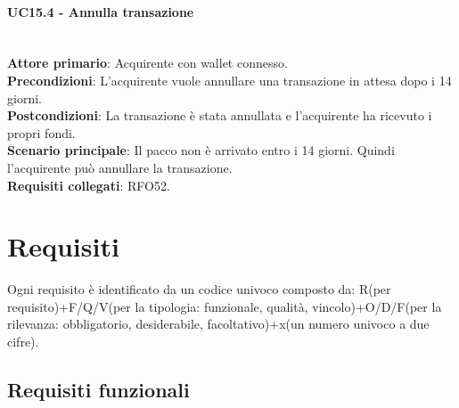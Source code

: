 \documentclass[a4paper, 12pt]{article}
\begin{document}
\paragraph{UC15.4 - Annulla transazione}\\
\textbf{Attore primario}: Acquirente  con wallet connesso.\\
\textbf{Precondizioni}: L'acquirente vuole annullare una transazione in attesa dopo i 14 giorni.\\
\textbf{Postcondizioni}: La transazione è stata annullata e l'acquirente ha ricevuto i propri fondi.\\
\textbf{Scenario principale}: Il pacco non è arrivato entro i 14 giorni. Quindi l'acquirente può annullare la transazione.\\
\textbf{Requisiti collegati}: RFO52.

\section{Requisiti}
Ogni requisito è identificato da un codice univoco composto da: R(per requisito)+F/Q/V(per la tipologia: funzionale, qualità, vincolo)+O/D/F(per la rilevanza: obbligatorio, desiderabile, facoltativo)+x(un numero univoco a due cifre).
\subsection{Requisiti funzionali}
\end{document}
